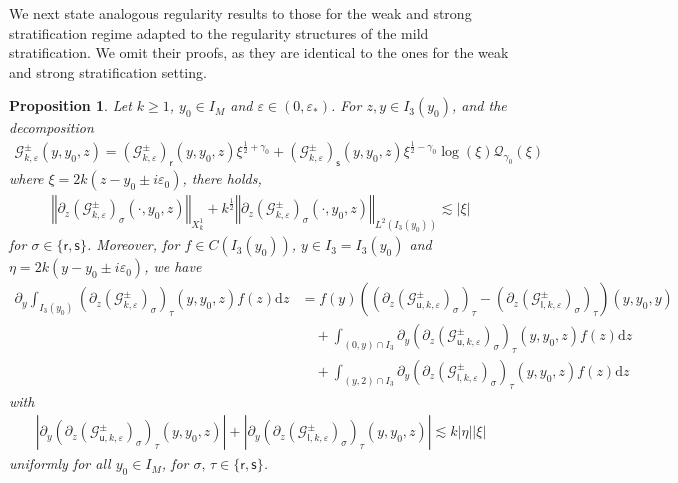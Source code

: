 \documentclass[11pt,reqno]{amsproc}
\newtheorem{proposition}{Proposition}[section]
\theoremstyle{definition}
\numberwithin{equation}{section}
\newcommand{\G}{{\mathcal{G}}}
\newcommand{\Q}{{\mathcal{Q}}}
\newcommand{\sr}{{\mathsf{r}}}
\newcommand{\s}{{\mathsf{s}}}
\newcommand{\su}{{\mathsf{u}}}
\renewcommand{\sl}{{\mathsf{l}}}
\renewcommand{\d}{\mathrm{d}}
\newcommand{\ep}{\varepsilon}
\begin{document}
We next state analogous regularity results to those for the weak and strong stratification regime adapted to the regularity structures of the mild stratification. We omit their proofs, as they are identical to the ones for the weak and strong stratification setting.

\begin{proposition}\label{prop:logsobolevregpartialdecomG}
Let $k\geq 1$, $y_0\in I_M$ and $\ep\in (0,\ep_*)$. For $z,y\in I_3(y_0)$, and the decomposition
\begin{align*}
\G_{k,\ep}^\pm(y,y_0,z) = \left( \G_{k,\ep}^\pm\right)_\sr(y,y_0,z) \xi^{\frac12 + \gamma_0} + \left( \G_{k,\ep}^\pm\right)_\s(y,y_0,z) \xi^{\frac12 - \gamma_0} \log(\xi)\Q_{\gamma_0}(\xi)
\end{align*}
where $\xi=2k(z-y_0\pm i\ep_0)$, there holds, 
\begin{align*}
\left\Vert \partial_z\left( \G_{k,\ep}^\pm\right)_\sigma(\cdot,y_0,z) \right\Vert_{X_k^1} + k^\frac12 \left\Vert \partial_z\left( \G_{k,\ep}^\pm \right)_\sigma(\cdot,y_0,z) \right \Vert_{L^2(I_3(y_0))}\lesssim |\xi|
\end{align*}
for $\sigma\in \lbrace \sr, \s \rbrace$. Moreover, for $f\in C(I_3(y_0))$, $y\in I_3=I_3(y_0)$ and $\eta=2k(y-y_0\pm i\ep_0)$, we have
\begin{align*}
\partial_y \int_{I_3(y_0)} \left( \partial_z \left( \G_{k,\ep}^\pm \right)_\sigma  \right)_\tau (y,y_0,z) f(z) \d z &= f(y) \left( \left( \partial_z \left( \G_{\su,k,\ep}^\pm \right)_\sigma \right)_\tau - \left( \partial_z \left( \G_{\sl,k,\ep}^\pm \right)_\sigma \right)_\tau \right)(y,y_0,y)  \\
&\quad + \int_{(0,y)\cap I_3} \partial_y \left( \partial_z \left( \G_{\su,k,\ep}^\pm \right)_\sigma  \right)_\tau (y,y_0,z) f(z) \d z \\
&\quad + \int_{(y,2)\cap I_3} \partial_y \left( \partial_z \left( \G_{\sl,k,\ep}^\pm \right)_\sigma  \right)_\tau (y,y_0,z) f(z) \d z
\end{align*}
with
\begin{align*}
\left\vert \partial_y \left( \partial_z \left( \G_{\su,k,\ep}^\pm \right)_\sigma  \right)_\tau(y,y_0,z) \right\vert + \left\vert \partial_y \left( \partial_z \left( \G_{\sl,k,\ep}^\pm \right)_\sigma  \right)_\tau(y,y_0,z) \right\vert \lesssim k |\eta||\xi|
\end{align*}
uniformly for all $y_0\in I_M$, for $\sigma,\,\tau\in \lbrace \sr, \s \rbrace$.
\end{proposition}
\end{document}
